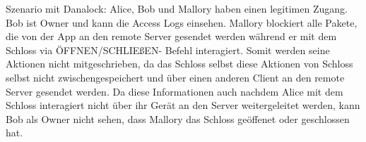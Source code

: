 \begin{itemize}[leftmargin=0cm,label={}]
                Szenario mit Danalock: Alice, Bob und Mallory haben einen legitimen Zugang.
                Bob ist Owner und kann die Access Logs einsehen.
                Mallory blockiert alle Pakete, die von der App an den remote Server gesendet werden während er mit dem Schloss via ÖFFNEN/\-SCHLIEßEN- Befehl interagiert.
                Somit werden seine Aktionen nicht mitgeschrieben, da das Schloss selbst diese Aktionen von Schloss selbst nicht zwischengespeichert und über einen anderen Client an den remote Server gesendet werden.
                Da diese Informationen auch nachdem Alice mit dem Schloss interagiert nicht über ihr Gerät an den Server weitergeleitet werden, kann Bob als Owner nicht sehen, dass Mallory das Schloss geöffenet oder geschlossen hat.
        \end{itemize}
        
